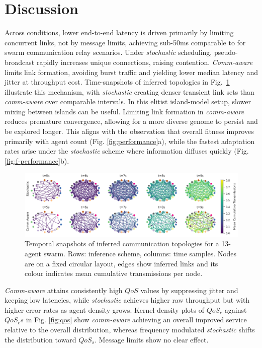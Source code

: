 \documentclass[conference]{IEEEtran}
\begin{document}
\section{Discussion}\label{sec:discussion}
Across conditions, lower end-to-end latency is driven primarily by limiting concurrent links, not by message limits, achieving sub-50ms comparable to \cite{hauert_evolved_2009} for swarm communication relay scenarios. Under \emph{stochastic} scheduling, pseudo-broadcast rapidly increases unique connections, raising contention. \emph{Comm-aware} limits link formation, avoiding burst traffic and yielding lower median latency and jitter at throughput cost. Time-snapshots of inferred topologies in Fig.~\ref{fig:convergence} illustrate this mechanism, with \emph{stochastic} creating denser transient link sets than \emph{comm-aware} over comparable intervals. In this elitist island-model setup, slower mixing between islands can be useful. Limiting link formation in \emph{comm-aware} reduces premature convergence, allowing for a more diverse genome to persist and be explored longer. This aligns with the observation that overall fitness improves primarily with agent count (Fig. \ref{fig:performance}a), while the fastest adaptation rates arise under the \emph{stochastic} scheme where information diffuses quickly (Fig. \ref{fig:f-performance}b). \\

\begin{figure}[h]
    \centering
    \includegraphics[width=1\textwidth]{convergence_impact.pdf}
    \caption{Temporal snapshots of inferred communication topologies for a 13-agent swarm. Rows: inference scheme, columns: time samples. Nodes are on a fixed circular layout, edges show inferred links and its colour indicates mean cumulative transmissions per node.}
    \label{fig:convergence}
\end{figure}

\emph{Comm-aware} attains consistently high $QoS$ values by suppressing jitter and keeping low latencies, while \emph{stochastic} achieves higher raw throughput but with higher error rates as agent density grows. Kernel-density plots of $QoS_c$ against $QoS_cs$ in Fig. \ref{fig:qos} show \emph{comm-aware} achieving an overall improved service relative to the overall distribution, whereas frequency modulated \emph{stochastic} shifts the distribution toward $QoS_s$. Message limits show no clear effect. \\
\end{document}
